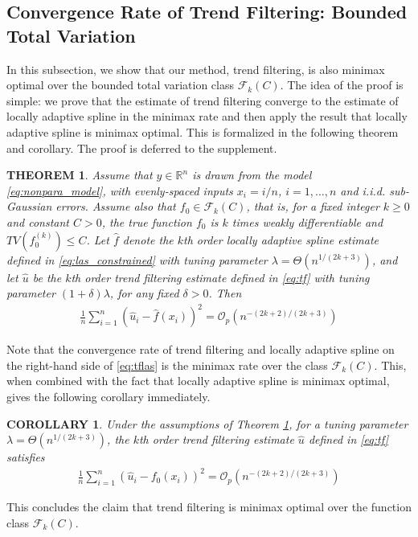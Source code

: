 \documentclass[a4paper]{article}
\newtheorem{theorem}{THEOREM}
\newtheorem{corollary}{COROLLARY}
\newcommand{\RR}{\mathbb{R}}
\renewcommand{\cal}{\mathcal}
\begin{document}
\subsection{Convergence Rate of Trend Filtering: Bounded Total Variation}
In this subsection, we show that our method, trend filtering, is also minimax optimal over the bounded total variation class $\cal{F}_k(C)$. The idea of the proof is simple: we prove that the estimate of trend filtering converge to the estimate of locally adaptive spline in the minimax rate and then apply the result that locally adaptive spline is minimax optimal. This is formalized in the following theorem and corollary. The proof is deferred to the supplement. 
\begin{theorem}
Assume that $y\in\RR^n$ is drawn from the model \eqref{eq:nonpara_model}, with evenly-spaced inputs $x_i = i/n$, $i = 1,\ldots, n$ and i.i.d. sub-Gaussian errors. Assume also that $f_0\in\cal{F}_k(C)$, that is, for a fixed integer $k\geq 0$ and constant $C > 0$, the true function $f_0$ is $k$ times weakly differentiable and $TV(f_0^{(k)})\leq C$. Let $\hat{f}$ denote the $k$th order locally adaptive spline estimate defined in \eqref{eq:las_constrained} with tuning parameter $\lambda = \Theta(n^{1/(2k+3)})$, and let $\hat{u}$ be the $k$th order trend filtering estimate defined in \eqref{eq:tf} with tuning parameter $(1+\delta)\lambda$, for any fixed $\delta > 0$. Then 
\begin{align}
\frac{1}{n}\sum_{i=1}^n(\hat{u}_i - \hat{f}(x_i))^2 = \cal{O}_p(n^{-(2k+2)/(2k+3)})
\label{eq:tflas}
\end{align}
\label{thm:1}
\end{theorem}
Note that the convergence rate of trend filtering and locally adaptive spline on the right-hand side of \eqref{eq:tflas} is the minimax rate over the class $\cal{F}_k(C)$. This, when combined with the fact that locally adaptive spline is minimax optimal, gives the following corollary immediately.

\begin{corollary}
Under the assumptions of Theorem \ref{thm:1}, for a tuning parameter $\lambda = \Theta(n^{1/(2k+3)})$, the $k$th order trend filtering estimate $\hat{u}$ defined in \eqref{eq:tf} satisfies
\begin{align*}
\frac{1}{n}\sum_{i=1}^n (\hat{u}_i - f_0(x_i))^2 = \cal{O}_p(n^{-(2k+2)/(2k+3)})
\end{align*}
\end{corollary}
This concludes the claim that trend filtering is minimax optimal over the function class $\cal{F}_k(C)$.
\end{document}
